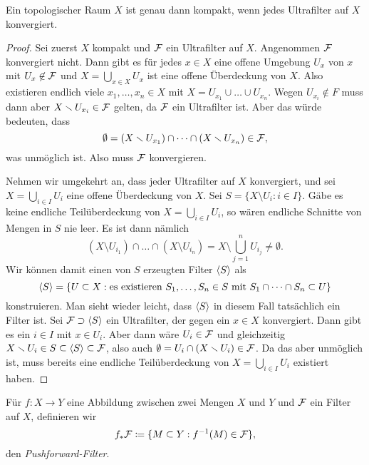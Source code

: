 \begin{theorem}\label{thm:ultrafilter-compactness}
  Ein topologischer Raum $X$ ist genau dann kompakt, wenn jedes Ultrafilter auf $X$ konvergiert.
\end{theorem}
\begin{proof}
  Sei zuerst $X$ kompakt und $\cal F$ ein Ultrafilter auf $X$. Angenommen $\cal F$ konvergiert nicht. Dann gibt es für jedes $x\in X$ eine offene Umgebung $U_x$ von $x$ mit $U_x\not\in \cal F$ und $X = \bigcup_{x\in X} U_x$ ist eine offene Überdeckung von $X$. Also existieren endlich viele $x_1,\dots,x_n\in X$ mit $X = U_{x_1}\cup\dots\cup U_{x_n}$. Wegen $U_{x_i}\not\in F$ muss dann aber $X\setminus U_{x_i}\in\cal F$ gelten, da $\cal F$ ein Ultrafilter ist. Aber das würde bedeuten, dass
  \[
    \emptyset = (X\setminus U_{x_1})\cap \dots\cap (X\setminus U_{x_n})\in\cal F,
  \]
  was unmöglich ist. Also muss $\cal F$ konvergieren.

  Nehmen wir umgekehrt an, dass jeder Ultrafilter auf $X$ konvergiert, und sei $X = \bigcup_{i\in I} U_i$ eine offene Überdeckung von $X$. Sei $S = \{X\setminus U_i : i\in I\}$. Gäbe es keine endliche Teilüberdeckung von $X = \bigcup_{i\in I} U_i$, so wären endliche Schnitte von Mengen in $S$ nie leer. Es ist dann nämlich
  \[
    (X\setminus U_{i_1})\cap\dots\cap(X\setminus U_{i_n}) = X\setminus\bigcup_{j=1}^n U_{i_j}\neq\emptyset.
  \]
  Wir können damit einen von $S$ erzeugten Filter $\<S>$ als
  \[
    \<S> = \{ U\subset X : \text{es existieren $S_1,\dots,S_n\in S$ mit $S_1\cap\dots\cap S_n\subset U$}\}
  \]
  konstruieren. Man sieht wieder leicht, dass $\<S>$ in diesem Fall tatsächlich ein Filter ist. Sei $\cal F\supset\<S>$ ein Ultrafilter, der gegen ein $x\in X$ konvergiert. Dann gibt es ein $i\in I$ mit $x\in U_i$. Aber dann wäre $U_i\in\cal F$ und gleichzeitig $X\setminus U_i\in S\subset\<S>\subset \cal F$, also auch $\emptyset = U_i\cap(X\setminus U_i)\in\cal F$. Da das aber unmöglich ist, muss bereits eine endliche Teilüberdeckung von $X = \bigcup_{i\in I} U_i$ existiert haben.
\end{proof}

\begin{definition}
Für $f\colon X\to Y$ eine Abbildung zwischen zwei Mengen $X$ und $Y$ und $\cal F$ ein Filter auf $X$, definieren wir
\[
f_*\cal F \coloneqq \{M\subset Y : f^{-1}(M)\in\cal F\},
\]
den \emph{Pushforward-Filter}.
\end{definition}

